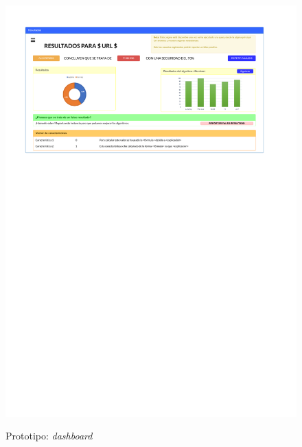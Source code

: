 \begin{figure}[h]
	\caption{Prototipo: \textit{dashboard}}
	\centering
	\includegraphics[width=\textwidth]{../img/anexos/mockups/2-mockups-dashboard}
	\label{mock:dashboard}
\end{figure}

